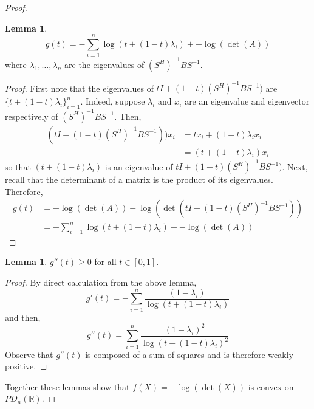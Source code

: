 \documentclass[letterpaper,12pt]{article}
\theoremstyle{definition}
\newtheorem{lemma}[theorem]{Lemma}
\begin{document}
\begin{proof}
	\begin{lemma}
	\begin{equation}
	g(t) = - \sum_{i=1}^n \log(t + (1-t)\lambda_i) + -\log(\det(A))
	\end{equation}
	where $\lambda_1, \ldots, \lambda_n$ are the eigenvalues of $(S^H)^{-1}BS^{-1}$. 
	\end{lemma}
	\begin{proof}
	First note that the eigenvalues of $tI + (1-t)(S^H)^{-1}BS^{-1})$ are $\{t + (1-t)\lambda_i\}_{i=1}^n$. Indeed, suppose $\lambda_i$ and $x_i$ are an eigenvalue and eigenvector respectively of $(S^H)^{-1}BS^{-1}$. Then, 
	\begin{align*}
	(tI + (1-t)(S^H)^{-1}BS^{-1}))x_i &= tx_i + (1-t)\lambda_i x_i \\
	&= (t + (1-t)\lambda_i) x_i
	\end{align*}
	so that $(t + (1-t)\lambda_i)$ is an eigenvalue of $tI + (1-t)(S^H)^{-1}BS^{-1})$.  Next, recall that the determinant of a matrix is the product of its eigenvalues. Therefore,
	\begin{align*}
	g(t) &= -\log(\det(A)) -\log(\det(tI + (1-t)(S^H)^{-1}BS^{-1})) \\
	&= - \sum_{i=1}^n \log(t + (1-t)\lambda_i) + -\log(\det(A))
	\end{align*}
	\end{proof}
	
	\begin{lemma}
	$g''(t) \geq 0$ for all $t \in [0,1]$. 
	\end{lemma}
	\begin{proof}
	By direct calculation from the above lemma,
	\begin{equation}
	g'(t) = - \sum_{i=1}^n \frac{(1-\lambda_i)}{\log(t + (1-t)\lambda_i)}
	\end{equation}
	and then,
	\begin{equation}
	g''(t) = \sum_{i=1}^n \frac{(1-\lambda_i)^2}{\log(t + (1-t)\lambda_i)^2}
	\end{equation}
	Observe that $g''(t)$ is composed of a sum of squares and is therefore weakly positive. 
	\end{proof}
	Together these lemmas show that $f(X) = -\log(\det(X))$ is convex on $PD_n (\mathbb{R})$. 
\end{proof}
\end{document}
